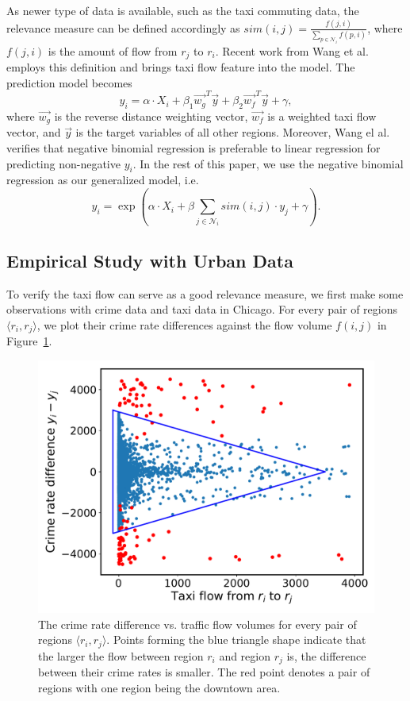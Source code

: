 As newer type of data is available, such as the taxi commuting data, the relevance measure can be defined accordingly as $sim(i,j) = \frac{f(j,i)}{\sum_{p \in \mathcal{N}_i} f(p,i)}$, where $f(j,i)$ is the amount of flow from $r_j$ to $r_i$.
Recent work from Wang et al.~\cite{wang2016crime} employs this definition and brings taxi flow feature into the model. The prediction model becomes 
\begin{equation}
\label{eq:gim}
y_i = \alpha \cdot X_i + \beta_1 \vec{w_g}^T \vec{y} + \beta_2 \vec{w_f}^T \vec{y} + \gamma,
\end{equation}
where $\vec{w_g}$ is the reverse distance weighting vector, $\vec{w_f}$ is a weighted taxi flow vector, and $\vec{y}$ is the target variables of all other regions. Moreover, Wang el al.~\cite{wang2016crime} verifies that negative binomial regression is preferable to linear regression for predicting non-negative $y_i$. In the rest of this paper, we use the negative binomial regression as our generalized model, i.e.  
\begin{equation}
\label{eq:nbr}
y_i = \exp (\alpha \cdot X_i + \beta \sum_{j \in \mathcal{N}_i} sim(i,j) \cdot y_j + \gamma).
\end{equation}


\subsection{Empirical Study with Urban Data}

To verify the taxi flow can serve as a good relevance measure, we first make some observations with crime data and taxi data in Chicago. For every pair of regions $\langle r_i, r_j \rangle$, we plot their crime rate differences against the flow volume $f(i,j)$ in Figure~\ref{fig:prelm}.

\begin{figure}[h]
\centering
\includegraphics[width=0.7\linewidth]{fig/crime-flow-preliminary.pdf}
\caption{The crime rate difference vs. traffic flow volumes for every pair of regions $\langle r_i, r_j \rangle$. Points forming the blue triangle shape indicate that the larger the flow between region $r_i$ and region $r_j$ is, the difference between their crime rates is smaller. The red point denotes a pair of regions with one region being the downtown area.}
\label{fig:prelm}
\end{figure}

